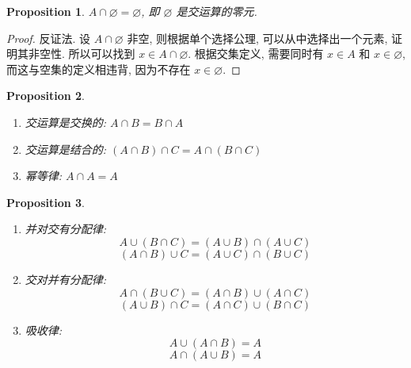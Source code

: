\documentclass[UTF8]{ctexart}
\theoremstyle{mystyle}
\newtheorem{proposition}{Proposition}[section]
\theoremstyle{myremark}
\theoremstyle{plain}
\begin{document}
\begin{proposition}
    $ A \cap \varnothing = \varnothing $, 即 $ \varnothing $ 是交运算的零元.
\end{proposition}

\begin{proof}
    反证法. 设 $ A \cap \varnothing $ 非空, 则根据单个选择公理, 可以从中选择出一个元素, 证明其非空性. 所以可以找到 $ x \in A \cap \varnothing $. 根据交集定义, 需要同时有 $ x \in A $ 和 $ x \in \varnothing $, 而这与空集的定义相违背, 因为不存在 $ x \in \varnothing $.
\end{proof}

\begin{proposition} \ 
    \begin{enumerate}
        \item 交运算是交换的: $ A \cap B = B \cap A $
        \item 交运算是结合的: $ (A \cap B) \cap C = A \cap (B \cap C) $
        \item 幂等律: $ A \cap A = A $
    \end{enumerate}
\end{proposition}

\begin{proposition} \ 
    \begin{enumerate}
        \item 并对交有分配律: \[ A \cup (B \cap C) = (A \cup B) \cap (A \cup C) \] \[ (A \cap B) \cup C = (A \cup C) \cap (B \cup C) \]
        \item 交对并有分配律: \[ A \cap (B \cup C) = (A \cap B) \cup (A \cap C) \] \[ (A \cup B) \cap C = (A \cap C) \cup (B \cap C) \]
        \item 吸收律: \[ A \cup (A \cap B) = A \] \[ A \cap (A \cup B) = A \]
    \end{enumerate}
\end{proposition}
\end{document}
